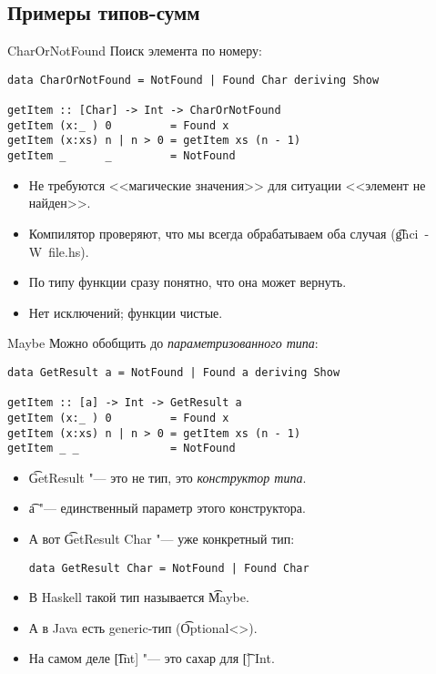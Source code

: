 \subsection{Примеры типов-сумм}
\begin{frame}
\end{frame}

\begin{frame}[fragile]{CharOrNotFound}
	Поиск элемента по номеру:
\begin{verbatim}
data CharOrNotFound = NotFound | Found Char deriving Show

getItem :: [Char] -> Int -> CharOrNotFound
getItem (x:_ ) 0         = Found x
getItem (x:xs) n | n > 0 = getItem xs (n - 1)
getItem _      _         = NotFound
\end{verbatim}
	\begin{itemize}
		\item Не требуются <<магические значения>> для ситуации <<элемент не найден>>.
		\item Компилятор проверяют, что мы всегда обрабатываем оба случая (\t{ghci~-W~file.hs}).
		\item По типу функции сразу понятно, что она может вернуть.
		\item Нет исключений; функции чистые.
	\end{itemize}	
\end{frame}


\begin{frame}[fragile]{Maybe}
	Можно обобщить до \textit{параметризованного типа}:
\begin{verbatim}
data GetResult a = NotFound | Found a deriving Show

getItem :: [a] -> Int -> GetResult a
getItem (x:_ ) 0         = Found x
getItem (x:xs) n | n > 0 = getItem xs (n - 1)
getItem _ _              = NotFound
\end{verbatim}
	\begin{itemize}
		\item \t{GetResult} "--- это не тип, это \textit{конструктор типа}.
		\item \t{a} "--- единственный параметр этого конструктора.
		\item А вот \t{GetResult Char} "--- уже конкретный тип:
\begin{verbatim}
data GetResult Char = NotFound | Found Char
\end{verbatim}
		\item В Haskell такой тип называется \t{Maybe}.
		\item А в Java есть generic-тип (\t{Optional<>}).
		\item На самом деле \t{[Int]} "--- это сахар для \t{[] Int}.
	\end{itemize}
\end{frame}


